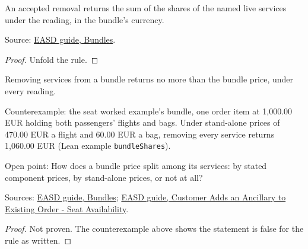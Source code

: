 \begin{theorem}
  \label{thm:ancillaries-bundle-returns-shares}
  An accepted removal returns the sum of the shares of the named live
  services under the reading, in the bundle's currency.

  Source: \href{https://standards.atlassian.net/wiki/spaces/EASD/pages/574619818}{EASD guide, Bundles}.
\end{theorem}
\begin{proof}
  Unfold the rule.
\end{proof}

\begin{theorem}
  \label{thm:ancillaries-bundle-return-le-price}
  Removing services from a bundle returns no more than the bundle price,
  under every reading.

  Counterexample: the seat worked example's bundle, one order item at
  1,000.00 EUR holding both passengers' flights and bags.  Under stand-alone
  prices of 470.00 EUR a flight and 60.00 EUR a bag, removing every service
  returns 1,060.00 EUR (Lean example \texttt{bundleShares}).

  Open point: How does a bundle price split among its services: by stated
  component prices, by stand-alone prices, or not at all?

  Sources: \href{https://standards.atlassian.net/wiki/spaces/EASD/pages/574619818}{EASD guide, Bundles};
  \href{https://standards.atlassian.net/wiki/spaces/EASD/pages/842268814}{EASD guide, Customer Adds an Ancillary to Existing Order - Seat Availability}.
\end{theorem}
\begin{proof}
  Not proven.  The counterexample above shows the statement is false for the
  rule as written.
\end{proof}

